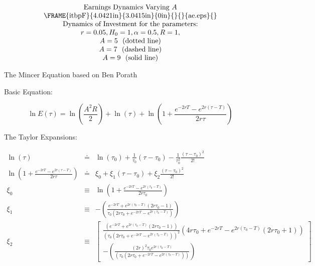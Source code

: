 \documentclass{article}
\numberwithin{equation}{section}
\begin{document}
\begin{equation*}
\begin{tabular}{c}
Earnings Dynamics $\text{Varying }A$ \\ 
\FRAME{itbpF}{4.0421in}{3.0415in}{0in}{}{}{ae.eps}{\special{language
"Scientific Word";type "GRAPHIC";maintain-aspect-ratio TRUE;display
"USEDEF";valid_file "F";width 4.0421in;height 3.0415in;depth
0in;original-width 5.8219in;original-height 4.3708in;cropleft "0";croptop
"1";cropright "1";cropbottom "0";filename 'AE.eps';file-properties "XNPEU";}}
\\ 
$\text{Dynamics of Investment for the parameters:}$ \\ 
$r=0.05,H_{0}=1,\alpha =0.5,R=1,$ \\ 
$A=5\text{ \ (dotted line)}$ \\ 
$A=7\text{ \ (dashed line)}$ \\ 
$A=9\text{ \ (solid line)}$%
\end{tabular}%
\end{equation*}

\pagebreak 

The Mincer Equation based on Ben Porath

Basic Equation:

\begin{equation*}
\ln E\left( \tau \right) =\ln \left( \frac{A^{2}R}{2}\right) +\ln \left(
\tau \right) +\ln \left( 1+\frac{e^{-2rT}-e^{2r(\tau -T)}}{2r\tau }\right) 
\end{equation*}

\pagebreak

The Taylor Expansions:

\begin{eqnarray*}
\ln \left( \tau \right) &\doteq &\ln \left( \tau _{0}\right) +\frac{1}{\tau
_{0}}\left( \tau -\tau _{0}\right) -\frac{1}{\tau _{0}^{2}}\frac{\left( \tau
-\tau _{0}\right) ^{2}}{2!} \\
\ln \left( 1+\frac{e^{-2rT}-e^{2r(\tau -T)}}{2r\tau }\right) &\doteq &\xi
_{0}+\xi _{1}\left( \tau -\tau _{0}\right) +\xi _{2}\frac{\left( \tau -\tau
_{0}\right) ^{2}}{2!} \\
\xi _{0} &\equiv &\ln \left( 1+\frac{e^{-2rT}-e^{2r(\tau _{0}-T)}}{2r\tau
_{0}}\right) \\
\xi _{1} &\equiv &-\left( \frac{e^{-2rT}+e^{2r(\tau _{0}-T)}\left( 2r\tau
_{0}-1\right) }{\tau _{0}\left( 2r\tau _{0}+e^{-2rT}-e^{2r(\tau
_{0}-T)}\right) }\right) \\
\xi _{2} &\equiv &\left[ 
\begin{array}{c}
\frac{\left( e^{-2rT}+e^{2r(\tau _{0}-T)}\left( 2r\tau _{0}-1\right) \right) 
}{\left( \tau _{0}\left( 2r\tau _{0}+e^{-2rT}-e^{2r(\tau _{0}-T)}\right)
\right) ^{2}}\left( 4r\tau _{0}+e^{-2rT}-e^{2r(\tau _{0}-T)}\left( 2r\tau
_{0}+1\right) \right) \\ 
-\left( \frac{\left( 2r\right) ^{2}\tau _{0}e^{2r(\tau _{0}-T)}}{\left( \tau
_{0}\left( 2r\tau _{0}+e^{-2rT}-e^{2r(\tau _{0}-T)}\right) \right) }\right)%
\end{array}%
\right]
\end{eqnarray*}
\end{document}
